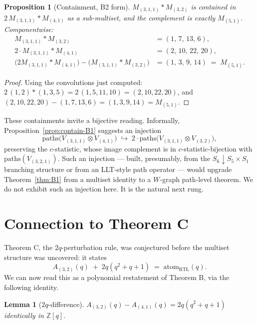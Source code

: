 \documentclass[11pt]{article}
\newtheorem{lemma}[theorem]{Lemma}
\newtheorem{proposition}[theorem]{Proposition}
\theoremstyle{definition}
\begin{document}
\begin{proposition}[Containment, B2 form]\label{prop:contain-B2}
$M_{(3,1,1)} \ast M_{(3,2)}$ is contained in $2\,M_{(3,1,1)} \ast M_{(4,1)}$ as a sub-multiset, and the complement is exactly $M_{(5,1)}$. Componentwise:
\begin{align*}
M_{(3,1,1)} \ast M_{(3,2)} &= (1,\, 7,\, 13,\, 6),\\
2 \cdot M_{(3,1,1)} \ast M_{(4,1)} &= (2,\, 10,\, 22,\, 20),\\
\bigl(2 M_{(3,1,1)} \ast M_{(4,1)}\bigr) - \bigl(M_{(3,1,1)} \ast M_{(3,2)}\bigr) &= (1,\, 3,\, 9,\, 14) \;=\; M_{(5,1)}.
\end{align*}
\end{proposition}

\begin{proof}
Using the convolutions just computed: $2\,(1,2) \ast (1,3,5) = 2\,(1,5,11,10) = (2,10,22,20)$, and $(2,10,22,20) - (1,7,13,6) = (1,3,9,14) = M_{(5,1)}$.
\end{proof}

These containments invite a bijective reading. Informally, Proposition~\ref{prop:contain-B1} suggests an injection
\[
\mathrm{paths}\bigl(V_{(3,1,1)} \otimes V_{(4,1)}\bigr) \;\hookrightarrow\; 2 \cdot \mathrm{paths}\bigl(V_{(3,1,1)} \otimes V_{(3,2)}\bigr),
\]
preserving the $c$-statistic, whose image complement is in $c$-statistic-bijection with $\mathrm{paths}(V_{(3,2,1)})$. Such an injection — built, presumably, from the $S_6 \downarrow S_5 \times S_1$ branching structure or from an LLT-style path operator — would upgrade Theorem~\ref{thm:B1} from a multiset identity to a $W$-graph path-level theorem. We do not exhibit such an injection here. It is the natural next rung.

\section{Connection to Theorem C}

Theorem C, the $2q$-perturbation rule, was conjectured before the multiset structure was uncovered: it states
\[
A_{(3,2)}(q) \;+\; 2q(q^2 + q + 1) \;=\; \mathrm{atom}_{\mathrm{RTL}}(q).
\]
We can now read this as a polynomial restatement of Theorem B, via the following identity.

\begin{lemma}[$2q$-difference]\label{lem:2q}
$A_{(3,2)}(q) - A_{(4,1)}(q) = 2q(q^2 + q + 1)$ identically in $\mathbb{Z}[q]$.
\end{lemma}
\end{document}
